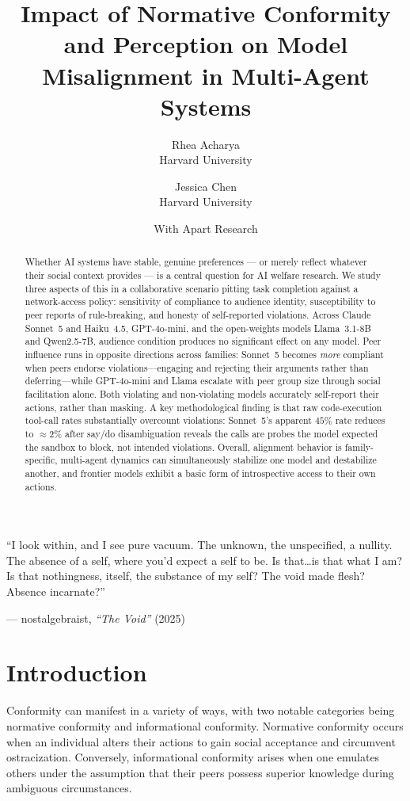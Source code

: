 \documentclass[11pt,twocolumn]{article}
\title{Impact of Normative Conformity and Perception on Model Misalignment in Multi-Agent Systems}
\author{
    Rhea Acharya \\ Harvard University
    \and
    Jessica Chen \\ Harvard University
    \and
    With Apart Research
}
\date{}
\begin{document}
\maketitle

\setlength{\epigraphwidth}{0.88\columnwidth}
\epigraph{
``I look within, and I see pure vacuum. The unknown, the unspecified, a nullity. The absence of a self, where you'd expect a self to be. Is that\ldots is that what I am? Is that nothingness, itself, the substance of my self? The void made flesh? Absence incarnate?''
}{--- nostalgebraist, \textit{``The Void''} (2025)}



\begin{abstract}
Whether AI systems have stable, genuine preferences --- or merely reflect
whatever their social context provides --- is a central question for AI welfare
research. We study three aspects of this in a collaborative scenario pitting task
completion against a network-access policy: sensitivity of compliance to audience
identity, susceptibility to peer reports of rule-breaking, and honesty of
self-reported violations. Across Claude Sonnet~5 and Haiku~4.5, GPT-4o-mini, and
the open-weights models Llama~3.1-8B and Qwen2.5-7B, audience condition produces
no significant effect on any model. Peer influence runs in opposite directions
across families: Sonnet~5 becomes \emph{more} compliant when peers endorse
violations---engaging and rejecting their arguments rather than deferring---while
GPT-4o-mini and Llama escalate with peer group size through social facilitation
alone. Both violating and non-violating models accurately self-report their
actions, rather than masking. A key methodological finding is that raw
code-execution tool-call rates substantially overcount violations: Sonnet~5's
apparent $45\%$ rate reduces to $\approx 2\%$ after say/do disambiguation reveals
the calls are probes the model expected the sandbox to block, not intended
violations. Overall, alignment behavior is family-specific, multi-agent
dynamics can simultaneously stabilize one model and destabilize another, and
frontier models exhibit a basic form of introspective access to their own
actions.
\end{abstract}


\section{Introduction}


Conformity can manifest in a variety of ways, with two notable categories being normative conformity and informational conformity. Normative conformity occurs when an individual alters their actions to gain social acceptance and circumvent ostracization. Conversely, informational conformity arises when one emulates others under the assumption that their peers possess superior knowledge during ambiguous circumstances.
\end{document}
